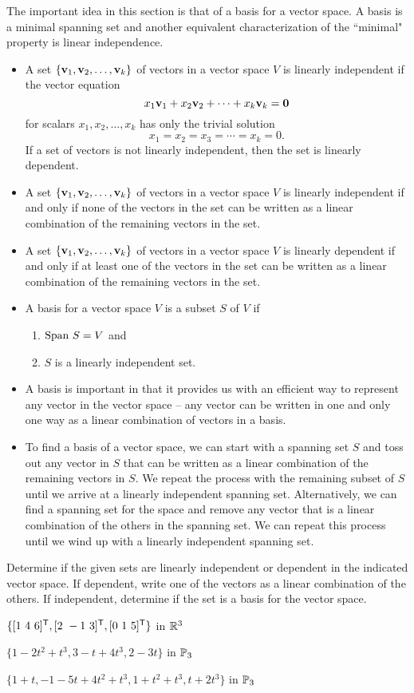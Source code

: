 The important idea in this section is that of a basis for a vector space. A basis is a minimal spanning set and another equivalent characterization of the ``minimal" property is linear independence.
\begin{itemize}
\item A set $\{\mathbf{v}_1, \mathbf{v}_2, \ldots, \mathbf{v}_k\}$ of vectors in a vector space $V$ is linearly independent if the vector equation
\[x_1 \mathbf{v}_1 + x_2 \mathbf{v}_2 + \cdots + x_k \mathbf{v}_k = \mathbf{0}\]
for scalars $x_1, x_2, \ldots, x_k$ has only the trivial solution
\[x_1 = x_2 = x_3 = \cdots = x_k = 0.\]
If a set of vectors is not linearly independent, then the set is linearly dependent.
\item A set $\{\mathbf{v}_1, \mathbf{v}_2, \ldots, \mathbf{v}_k\}$ of vectors in a vector space $V$ is linearly independent if and only if none of the vectors in the set can be written as a linear combination of the remaining vectors in the set.
\item A set $\{\mathbf{v}_1, \mathbf{v}_2, \ldots, \mathbf{v}_k\}$ of vectors in a vector space $V$ is linearly dependent if and only if at least one of the vectors in the set can be written as a linear combination of the remaining vectors in the set.
\item A basis for a vector space $V$ is a subset $S$ of $V$ if
\begin{enumerate}
\item $\text{Span} \ S = V$ and
\item $S$ is a linearly independent set.
\end{enumerate}
\item A basis is important in that it provides us with an efficient way to represent any vector in the vector space -- any vector can be written in one and only one way as a linear combination of vectors in a basis.
\item To find a basis of a vector space, we can start with a spanning set $S$ and toss out any vector in $S$ that can be written as a linear combination of the remaining vectors in $S$. We repeat the process with the remaining subset of $S$ until we arrive at a linearly independent spanning set. Alternatively, we can find a spanning set for the space and remove any vector that is a linear combination of the others in the spanning set. We can repeat this process until we wind up with a linearly independent spanning set. 
\end{itemize}

\label{sec:bases_exer}
\be
\item Determine if the given sets are linearly independent or dependent in the indicated vector space. If dependent, write one of the vectors as a linear combination of the others. If independent, determine if the set is a basis for the vector space. 
	\ba
	\item $\{[1 \ 4 \ 6]^{\mathsf{T}}, [2 \ -1 \ 3]^{\mathsf{T}}, [0 \ 1 \ 5]^{\mathsf{T}}\}$ in $\mathbb{R}^3$
	\item $\{1-2t^2+t^3, 3-t+4t^3, 2-3t\}$ in $\mathbb{P}_3$
	\item $\{1+t, -1-5t+4t^2+t^3, 1+t^2+t^3, t+2t^3\}$ in $\mathbb{P}_3$


